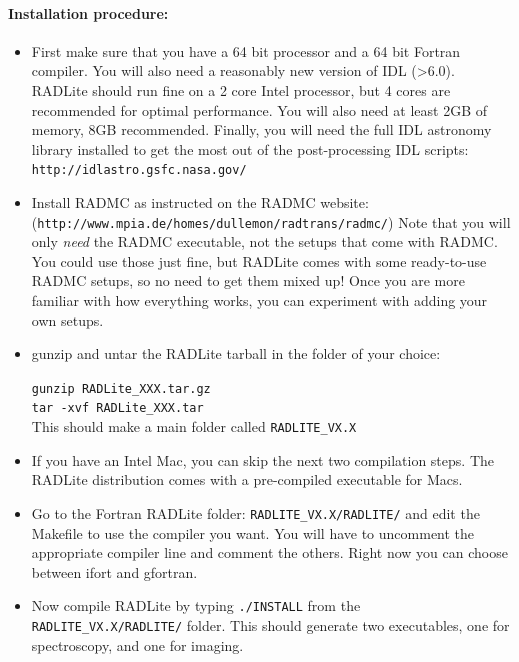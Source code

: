 \documentclass[11pt]{article}
\begin{document}
\paragraph{Installation procedure:}
\begin{itemize}

\item First make sure that you have a 64 bit processor and a 64 bit Fortran compiler. You will also need
a reasonably new version of IDL (>6.0). RADLite should run fine on a 2 core Intel processor, but 4 cores are 
recommended for optimal performance. You will also need at least 2GB of memory, 8GB recommended. Finally, 
you will need the full IDL astronomy library installed to get the most out of the post-processing IDL scripts: {\tt http://idlastro.gsfc.nasa.gov/}

\item Install RADMC as instructed on the RADMC website: \\
({\tt http://www.mpia.de/homes/dullemon/radtrans/radmc/})
Note that you will only {\it need} the RADMC executable, not the setups that
come with RADMC. You could use those just fine, but RADLite comes
with some ready-to-use RADMC setups, so no need to get them mixed up! Once you are
more familiar with how everything works, you can experiment with adding your own setups. 

\item gunzip and untar the RADLite tarball in the folder of your choice:

{\tt gunzip RADLite\_XXX.tar.gz}\\
{\tt tar -xvf RADLite\_XXX.tar} \\

This should make a main folder called {\tt RADLITE\_VX.X}
\item If you have an Intel Mac, you can skip the next two compilation steps. The RADLite distribution
comes with a pre-compiled executable for Macs. 

\item Go to the Fortran RADLite folder: {\tt RADLITE\_VX.X/RADLITE/} and edit the Makefile to use the compiler you want. You will have to
uncomment the appropriate compiler line and comment the others. Right now you can choose between ifort and gfortran.  

\item Now compile RADLite by typing {\tt ./INSTALL} from the {\tt RADLITE\_VX.X/RADLITE/} folder. This should generate two executables, one
for spectroscopy, and one for imaging. 


\end{itemize}
\end{document}
